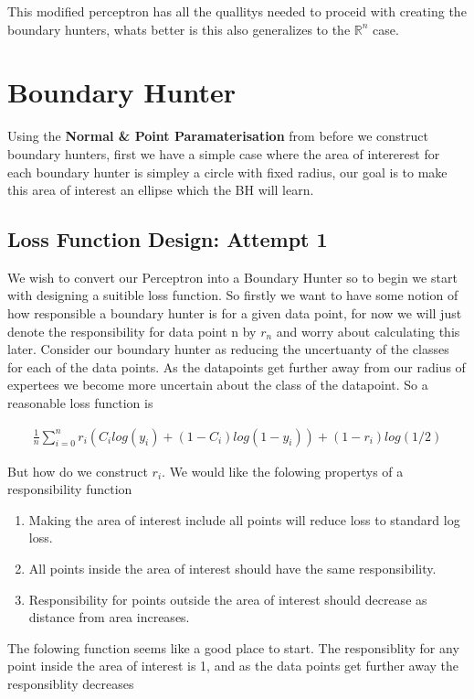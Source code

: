 \documentclass{article}
\begin{document}
This modified perceptron has all the quallitys needed to proceid with creating the boundary hunters, whats better is this also generalizes to the $\mathbb{R}^n$ case.

\section{Boundary Hunter}
Using the \textbf{Normal \& Point Paramaterisation} from before we construct boundary hunters, first we have a simple case where the area of intererest for each boundary hunter is simpley a circle with fixed radius, our goal is to make this area of interest an ellipse which the BH will learn.

\subsection{Loss Function Design: Attempt 1}
We wish to convert our Perceptron into a Boundary Hunter so to begin we start with designing a suitible loss function. So firstly we want to have some notion of how responsible a boundary hunter is for a given data point, for now we will just denote the responsibility for data point n by $r_n$ and worry about calculating this later. Consider our boundary hunter as reducing the uncertuanty of the classes for each of the data points. As the datapoints get further away from our radius of expertees we become more uncertain about the class of the datapoint. So a reasonable loss function is 

\begin{align}
\frac{1}{n} \sum_{i=0}^n r_i(C_i log(y_i) + (1-C_i)log(1-y_i)) + (1-r_i) log(1/2)
\end{align}

But how do we construct $r_i$. We would like the folowing propertys of a responsibility function

\begin{enumerate}
\item Making the area of interest include all points will reduce loss to standard log loss.
\item All points inside the area of interest should have the same responsibility.
\item Responsibility for points outside the area of interest should decrease as distance from area increases.
\end{enumerate}

The folowing function seems like a good place to start. The responsiblity for any point inside the area of interest is 1, and as the data points get further away the responsiblity decreases
\end{document}
